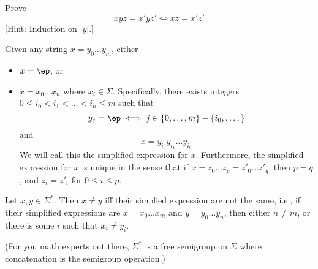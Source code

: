 \begin{ex}
Prove
\[ xyz = x'yz' \iff xz = x'z' \]
[Hint: Induction on $|y|$.]
\end{ex}

\newpage
\begin{ex}
Given any string $x = y_0\ldots y_m$, either
\begin{itemize}
 \item $x = \ep$, or
 \item $x = x_0 \ldots x_n$ where $x_i \in \Sigma$. Specifically,
       there exists integers $0 \leq i_0 < i_1 < \ldots < i_n \leq m$ such that
       \[
        y_j =
        \ep \iff j \in \{0,\ldots,m\} - \{i_0, \ldots, \}
       \]
      and
      \[
       x = y_{i_0} y_{i_1} \ldots y_{i_n}
      \]
      We will call this the simplified expression for $x$. Furthermore,
      the simplified expression for $x$ is unique in the sense that if $x
      = z_0 \ldots z_p = z'_0 \ldots z'_q$, then $p=q$, and $z_i = z'_i$
      for $0\leq i \leq p$.
\end{itemize}
\end{ex}

\begin{defn}
Let $x,y \in \Sigma^*$. Then $x \neq y$ iff their simplied
expression are not the same, i.e., if their simplified expressions
are $x = x_0\ldots x_m$ and $y=y_0 \ldots y_n$, then either $n
\neq m$, or there is some $i$ such that $x_i \neq y_i$.
\end{defn}


(For you math experts out there, $\Sigma^*$ is a free semigroup on
$\Sigma$ where concatenation is the semigroup operation.)
